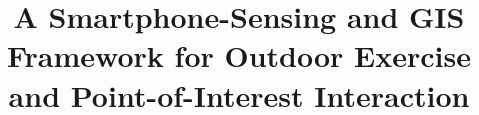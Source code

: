 \documentclass[conference]{IEEEtran}
\begin{document}
\title{A Smartphone-Sensing and GIS Framework for Outdoor Exercise and Point-of-Interest Interaction}
\author{}
\maketitle








\end{document}
